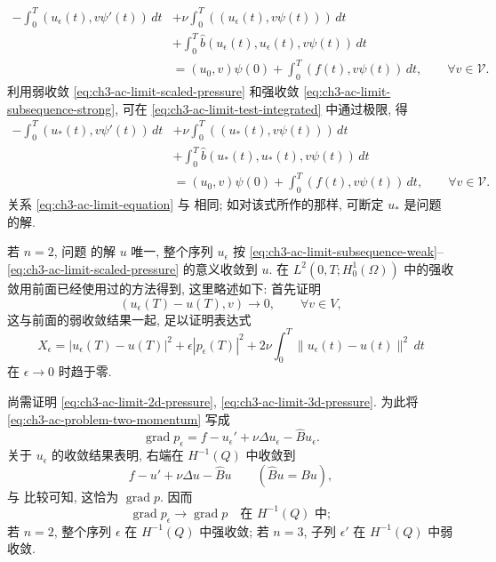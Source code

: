 \begin{Proof}
\begin{equation}
\begin{aligned}
-\int_0^T(u_\epsilon(t),v\psi'(t))\,dt
&+\nu\int_0^T((u_\epsilon(t),v\psi(t)))\,dt\\
&+\int_0^T\widehat b(u_\epsilon(t),u_\epsilon(t),v\psi(t))\,dt\\
&=(u_0,v)\psi(0)+\int_0^T(f(t),v\psi(t))\,dt,
\qquad\forall v\in\mathcal V.
\end{aligned}
\label{eq:ch3-ac-limit-test-integrated}
\end{equation}
利用弱收敛 \eqref{eq:ch3-ac-limit-scaled-pressure} 和强收敛 \eqref{eq:ch3-ac-limit-subsequence-strong}, 可在 \eqref{eq:ch3-ac-limit-test-integrated} 中通过极限, 得
\begin{equation}
\begin{aligned}
-\int_0^T(u_*(t),v\psi'(t))\,dt
&+\nu\int_0^T((u_*(t),v\psi(t)))\,dt\\
&+\int_0^T\widehat b(u_*(t),u_*(t),v\psi(t))\,dt\\
&=(u_0,v)\psi(0)+\int_0^T(f(t),v\psi(t))\,dt,
\qquad\forall v\in\mathcal V.
\end{aligned}
\label{eq:ch3-ac-limit-equation}
\end{equation}
关系 \eqref{eq:ch3-ac-limit-equation} 与  相同; 如对该式所作的那样, 可断定 $u_*$ 是问题  的解.

若 $n=2$, 问题  的解 $u$ 唯一, 整个序列 $u_\epsilon$ 按 \eqref{eq:ch3-ac-limit-subsequence-weak}--\eqref{eq:ch3-ac-limit-scaled-pressure} 的意义收敛到 $u$. 在 $L^2(0,T;H_0^1(\Omega))$ 中的强收敛用前面已经使用过的方法得到, 这里略述如下: 首先证明
\[
(u_\epsilon(T)-u(T),v)\longrightarrow0,
\qquad\forall v\in V,
\]
这与前面的弱收敛结果一起, 足以证明表达式
\begin{equation}
X_\epsilon=|u_\epsilon(T)-u(T)|^2
+\epsilon|p_\epsilon(T)|^2
+2\nu\int_0^T\lVert u_\epsilon(t)-u(t)\rVert^2\,dt
\label{eq:ch3-ac-limit-strong-energy-error}
\end{equation}
在 $\epsilon\to0$ 时趋于零.

\hypertarget{chapter-03-page-314}{}
尚需证明 \eqref{eq:ch3-ac-limit-2d-pressure}, \eqref{eq:ch3-ac-limit-3d-pressure}. 为此将 \eqref{eq:ch3-ac-problem-two-momentum} 写成
\[
\operatorname{grad}p_\epsilon
=f-u_\epsilon'+\nu\Delta u_\epsilon-\widehat B u_\epsilon.
\]
关于 $u_\epsilon$ 的收敛结果表明, 右端在 $H^{-1}(Q)$ 中收敛到
\[
f-u'+\nu\Delta u-\widehat B u
\qquad(\widehat B u=Bu),
\]
与  比较可知, 这恰为 $\operatorname{grad}p$. 因而
\[
\operatorname{grad}p_\epsilon\longrightarrow\operatorname{grad}p
\quad\text{在 }H^{-1}(Q)\text{ 中};
\]
若 $n=2$, 整个序列 $\epsilon$ 在 $H^{-1}(Q)$ 中强收敛; 若 $n=3$, 子列 $\epsilon'$ 在 $H^{-1}(Q)$ 中弱收敛.
\end{Proof}

